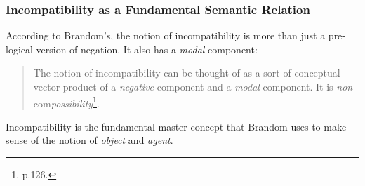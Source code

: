 \subsubsection{Incompatibility as a Fundamental Semantic Relation}
According to Brandom's, the notion of incompatibility is more than just a pre-logical version of negation. 
It also has a \emph{modal} component:
\begin{quote}
The notion of incompatibility can be thought of as a sort of conceptual vector-product of a \emph{negative} component and a \emph{modal} component. It is \emph{non}-com\emph{possibility}\footnote{\cite{brandom} p.126.}.
\end{quote}
Incompatibility is the fundamental master concept that Brandom uses to make sense of the notion of \emph{object} and \emph{agent}.

